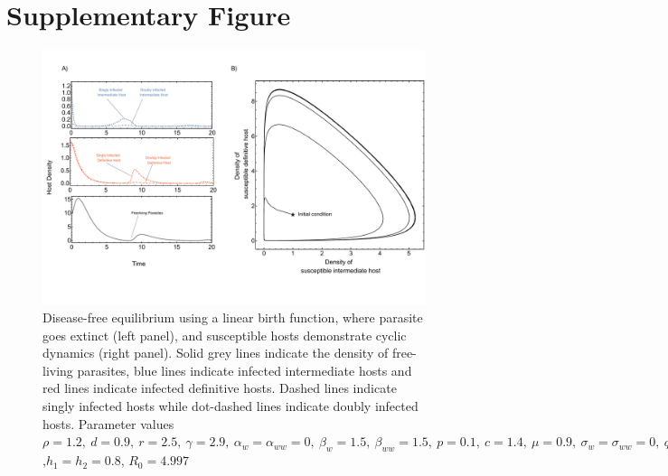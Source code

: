 \documentclass[11pt]{article}
\begin{document}
\section*{Supplementary Figure}
%
\begin{figure}[!ht]
\includegraphics[width=\textwidth]{Figures/diseasefree_linear.pdf}
\caption{Disease-free equilibrium using a linear birth function, where parasite goes extinct (left panel), and susceptible hosts demonstrate cyclic dynamics (right panel). 
Solid grey lines indicate the density of free-living parasites, blue lines indicate infected intermediate hosts and red lines indicate infected definitive hosts. 
Dashed lines indicate singly infected hosts while dot-dashed lines indicate doubly infected hosts. Parameter values  $\rho = 1.2, \  d = 0.9, \  r = 2.5, \ \gamma = 2.9, \ \alpha_w =  \alpha_{ww} =  0, \ \beta_w  = 1.5, \ \beta_{ww} = 1.5, \ p = 0.1,  \ c = 1.4, \ \mu = 0.9,  \ \sigma_w = \sigma_{ww} = 0, \ q = 0.01, \  f_w = 6.5, \  f_{ww} = 7.5, \ \delta = 0.9$,$h_1 = h_2 = 0.8$, $R_0 = 4.997$ } 
\label{fig:diseasefree:linear}
\end{figure}



\end{document}
